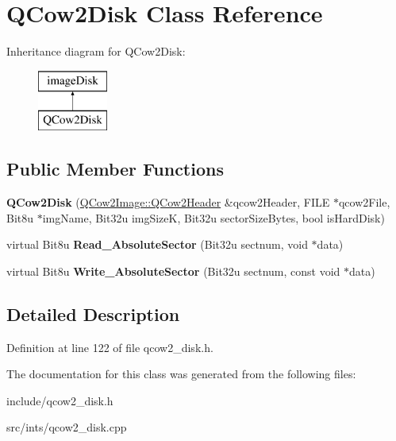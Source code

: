 \hypertarget{classQCow2Disk}{\section{Q\-Cow2\-Disk Class Reference}
\label{classQCow2Disk}
}
Inheritance diagram for Q\-Cow2\-Disk\-:\begin{figure}[H]
\begin{center}
\leavevmode
\includegraphics[height=2.000000cm]{classQCow2Disk}
\end{center}
\end{figure}
\subsection*{Public Member Functions}
\begin{DoxyCompactItemize}
\item 
\hypertarget{classQCow2Disk_a62cd3e9dfea214a39e2e565917d1fa4c}{{\bfseries Q\-Cow2\-Disk} (\hyperlink{structQCow2Image_1_1QCow2Header}{Q\-Cow2\-Image\-::\-Q\-Cow2\-Header} \&qcow2\-Header, F\-I\-L\-E $\ast$qcow2\-File, Bit8u $\ast$img\-Name, Bit32u img\-Size\-K, Bit32u sector\-Size\-Bytes, bool is\-Hard\-Disk)}\label{classQCow2Disk_a62cd3e9dfea214a39e2e565917d1fa4c}

\item 
\hypertarget{classQCow2Disk_add204620c64ed072d1325c5ea074af69}{virtual Bit8u {\bfseries Read\-\_\-\-Absolute\-Sector} (Bit32u sectnum, void $\ast$data)}\label{classQCow2Disk_add204620c64ed072d1325c5ea074af69}

\item 
\hypertarget{classQCow2Disk_a80e67fbee4b7d429907ad43bc1f54fa5}{virtual Bit8u {\bfseries Write\-\_\-\-Absolute\-Sector} (Bit32u sectnum, const void $\ast$data)}\label{classQCow2Disk_a80e67fbee4b7d429907ad43bc1f54fa5}

\end{DoxyCompactItemize}


\subsection{Detailed Description}


Definition at line 122 of file qcow2\-\_\-disk.\-h.



The documentation for this class was generated from the following files\-:\begin{DoxyCompactItemize}
\item 
include/qcow2\-\_\-disk.\-h\item 
src/ints/qcow2\-\_\-disk.\-cpp\end{DoxyCompactItemize}
